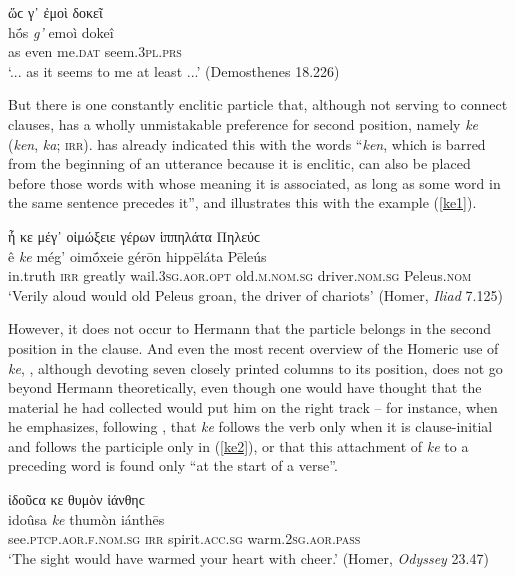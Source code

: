 \begin{exe}
\ex ὥϲ γ᾽ ἐμοὶ δοκεῖ\\
\gll hṓs \emph{g'} emoì dokeî\\
as even me.\textsc{dat} seem.\textsc{3pl.prs}\\
\trans `... as it seems to me at least ...' (Demosthenes 18.226)
\label{adv19}
\end{exe}

But there is one constantly enclitic particle that, although not serving to connect clauses, has a wholly unmistakable preference for second position, namely \textit{ke} (\textit{ken}, \textit{ka}; \textsc{irr}). \citet[7]{Hermann1831} has already indicated this with the words ``\textit{ken}, which is barred from the beginning of an utterance because it is enclitic, can also be placed before those words with whose meaning it is associated, as long as some word in the same sentence precedes it'', and illustrates this with the example (\ref{ke1}).

\begin{exe}
\ex ἦ κε μέγ᾽ οἰμώξειε γέρων ἱππηλάτα Πηλεύϲ\\
\gll ê \emph{ke} még' oimṓxeie gérōn hippēláta Pēleús\\
in.truth \textsc{irr} greatly wail.\textsc{3sg.aor.opt} old.\textsc{m.nom.sg} driver.\textsc{nom.sg} Peleus.\textsc{nom}\\
\trans `Verily aloud would old Peleus groan, the driver of chariots' (Homer, \textit{Iliad} 7.125)
\label{ke1}
\end{exe}

However, it does not occur to Hermann that the particle belongs in the second position in the clause. And even the most recent overview of the Homeric use of \textit{ke}, \citet{Eberhard1885}, although devoting seven closely printed columns to its position, does not go beyond Hermann theoretically, even though one would have thought that the material he had collected would put him on the right track -- for instance, when he emphasizes, following \citet[34]{Schnorr1864}, that \textit{ke} follows the verb only when it is clause-initial and follows the participle only in (\ref{ke2}), or that this attachment of \textit{ke} to a preceding word is found only ``at the start of a verse''.

\begin{exe}
\ex ἰδοῦϲα κε θυμὸν ἰάνθηϲ\\
\gll idoûsa \emph{ke} thumòn iánthēs\\
see.\textsc{ptcp.aor.f.nom.sg} \textsc{irr} spirit.\textsc{acc.sg} warm.\textsc{2sg.aor.pass}\\
\trans `The sight would have warmed your heart with cheer.' (Homer, \textit{Odyssey} 23.47)
\label{ke2}
\end{exe}

